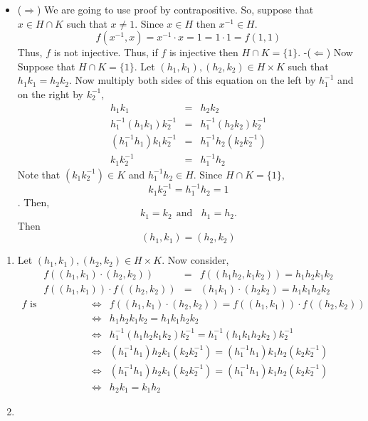 \documentclass[
]{book}
\providecommand{\tightlist}{%
  \setlength{\itemsep}{0pt}\setlength{\parskip}{0pt}}
\begin{document}
\begin{itemize}
\tightlist
\item
  (\(\Longrightarrow\)) We are going to use proof by contrapositive. So,
  suppose that \(x\in H\cap K\) such that \(x \neq 1\). Since \(x\in H\)
  then \(x^{-1} \in H\). \[f(x^{-1},x)=x^{-1}\cdot x=1=1\cdot 1=f(1,1)\]
  Thus, \(f\) is not injective. Thus, if \(f\) is injective then
  \(H \cap K = \{1\}\). -(\(\Longleftarrow\)) Now Suppose that
  \(H \cap K = \{1\}\). Let \((h_1, k_1),(h_2, k_2)\in H \times K\) such
  that \(h_1k_1 = h_2k_2\). Now multiply both sides of this equation on
  the left by \(h_1^{-1}\) and on the right by \(k_2^{-1}\),
  \begin{eqnarray}
  h_1k_1 &=& h_2k_2\\
  h_1^{-1}(h_1k_1)k_2^{-1} &=& h_1^{-1}(h_2k_2)k_2^{-1}\\
  (h_1^{-1}h_1)k_1k_2^{-1} &=& h_1^{-1}h_2(k_2k_2^{-1})\\
  k_1k_2^{-1} &=& h_1^{-1}h_2
  \end{eqnarray} Note that \((k_1k_2^{-1})\in K\) and
  \(h_1^{-1}h_2\in H\). Since \(H \cap K = \{1\}\),
  \[k_1k_2^{-1} = h_1^{-1}h_2 = 1\]. Then, \[
  k_1=k_2~~\text{and}~~~~h_1=h_2.
  \] Then \[(h_1, k_1) = (h_2, k_2)\]
\end{itemize}

\begin{enumerate}
\def\labelenumi{\alph{enumi}.}
\setcounter{enumi}{1}
\tightlist
\item
  Let \((h_1, k_1),(h_2, k_2)\in H \times K\). Now consider,
  \begin{eqnarray}
  f((h_1,k_1)\cdot (h_2,k_2))&=&f((h_1h_2,k_1k_2))=h_1h_2k_1k_2\\
  f((h_1,k_1))\cdot f((h_2,k_2))&=& (h_1k_1)\cdot(h_2k_2)=h_1k_1h_2k_2
  \end{eqnarray} \begin{eqnarray}
  f\text{ is homorphism} &\iff & 
  f((h_1,k_1)\cdot (h_2,k_2))=f((h_1,k_1))\cdot f((h_2,k_2))\\
  &\iff & h_1h_2k_1k_2=h_1k_1h_2k_2\\
  &\iff & h_1^{-1}(h_1h_2k_1k_2)k_2^{-1}=h_1^{-1}(h_1k_1h_2k_2)k_2^{-1}\\
  &\iff & (h_1^{-1}h_1)h_2k_1(k_2k_2^{-1})=(h_1^{-1}h_1)k_1h_2(k_2k_2^{-1})\\
  &\iff & (h_1^{-1}h_1)h_2k_1(k_2k_2^{-1})=(h_1^{-1}h_1)k_1h_2(k_2k_2^{-1})\\
  &\iff & h_2k_1=k_1h_2
  \end{eqnarray}
\item
\end{enumerate}
\end{document}
